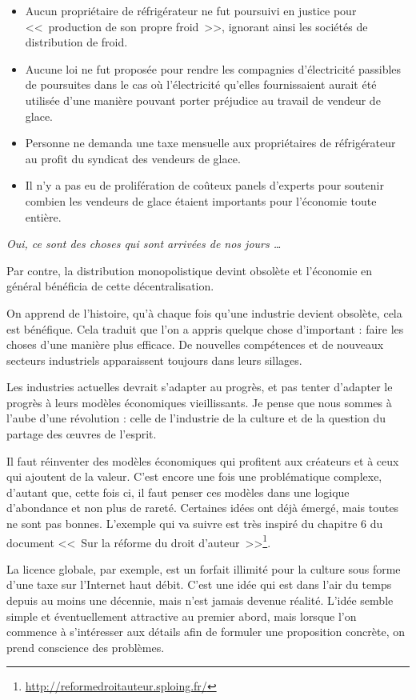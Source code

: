 \begin{itemize}
\item Aucun propriétaire de réfrigérateur ne fut poursuivi en justice pour <<~production de son propre froid~>>, ignorant ainsi les sociétés de distribution de froid.
\item Aucune loi ne fut proposée pour rendre les compagnies d'électricité passibles de poursuites dans le cas où l'électricité qu'elles fournissaient aurait été utilisée d'une manière pouvant porter préjudice au travail de vendeur de glace.
\item Personne ne demanda une taxe mensuelle aux propriétaires de réfrigérateur au profit du syndicat des vendeurs de glace.
\item Il n'y a pas eu de prolifération de coûteux panels d'experts pour soutenir combien les vendeurs de glace étaient importants pour l'économie toute entière.
\end{itemize}

\textit{Oui, ce sont des choses qui sont arrivées de nos jours \dots{}}

Par contre, la distribution monopolistique devint obsolète et l'économie en général bénéficia de cette décentralisation.

On apprend de l'histoire, qu'à chaque fois qu'une industrie devient obsolète, cela est bénéfique.
Cela traduit que l'on a appris quelque chose d'important : faire les choses d'une manière plus efficace.
De nouvelles compétences et de nouveaux secteurs industriels apparaissent toujours dans leurs sillages.

Les industries actuelles devrait s'adapter au progrès, et pas tenter d'adapter le progrès à leurs modèles économiques vieillissants.
Je pense que nous sommes à l'aube d'une révolution : celle de l'industrie de la culture et de la question du partage des œuvres de l'esprit.

Il faut réinventer des modèles économiques qui profitent aux créateurs et à ceux qui ajoutent de la valeur.
C'est encore une fois une problématique complexe, d'autant que, cette fois ci, il faut penser ces modèles dans une logique d'abondance et non plus de rareté.
Certaines idées ont déjà émergé, mais toutes ne sont pas bonnes.
L'exemple qui va suivre est très inspiré du chapitre 6 du document <<~Sur la réforme du droit d'auteur~>>\footnote{\url{http://reformedroitauteur.sploing.fr/}}.

La licence globale, par exemple, est un forfait illimité pour la culture sous forme d'une taxe sur l'Internet haut débit.
C'est une idée qui est dans l'air du temps depuis au moins une décennie, mais n'est jamais devenue réalité.
L'idée semble simple et éventuellement attractive au premier abord, mais lorsque l'on commence à s'intéresser aux détails afin de formuler une proposition concrète, on prend conscience des problèmes.

